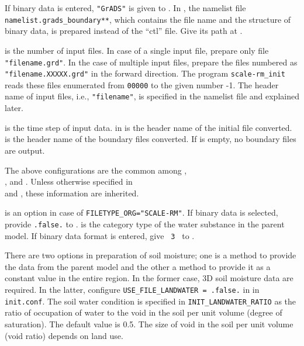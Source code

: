 If binary data is entered, \verb|"GrADS"| is given to .
In \scalerm, the namelist file \verb|namelist.grads_boundary**|, which contains the file name and the structure of binary data, is prepared instead of the ``ctl'' file. Give its path at .

 is the number of input files.
In case of a single input file, prepare only file \verb|"filename.grd"|.
In the case of multiple input files, prepare the files numbered as \verb|"filename.XXXXX.grd"| in the forward direction.
The program \verb|scale-rm_init| reads these files enumerated from \verb|00000| to the given number -1.
The header name of input files, i.e., \verb|"filename"|, is specified in the namelist file and explained later.

 is the time step of input data.
 in  is the header name of the initial file converted.
 is the header name of the boundary files converted.
If  is empty, no boundary files are output.

The above configurations are the common among ,\\ , and . Unless otherwise specified in\\
 and , these information are inherited.

 is an option in case of \verb|FILETYPE_ORG="SCALE-RM"|.
If binary data is selected, provide \verb|.false.| to .
 is the category type of the water substance in the parent model.
If binary data format is entered, give \verb| 3 | to .

There are two options in preparation of soil moisture; one is a method to provide the data from the parent model and the other a method to provide it as a constant value in the entire region.
In the former case, 3D soil moisture data are required. In the latter, configure \verb|USE_FILE_LANDWATER = .false.| in  in \verb|init.conf|.
The soil water condition is specified in \verb|INIT_LANDWATER_RATIO| as the ratio of occupation of water to the void in the soil per unit volume (degree of saturation). The default value is 0.5. The size of void in the soil per unit volume (void ratio) depends on land use.

